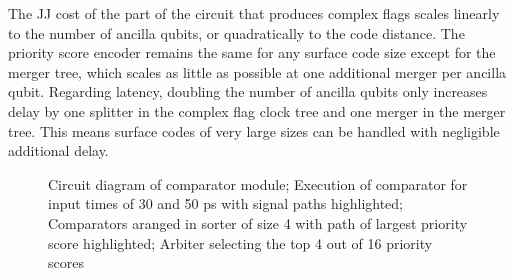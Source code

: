 The JJ cost of the part of the circuit that produces complex flags scales linearly to the number of ancilla qubits, or quadratically to the code distance.
The priority score encoder remains the same for any surface code size except for the merger tree, which scales as little as possible at one additional merger per ancilla qubit.
Regarding latency, doubling the number of ancilla qubits only increases delay by one splitter in the complex flag clock tree and one merger in the merger tree.
This means surface codes of very large sizes can be handled with negligible additional delay.
    \begin{figure}

\caption[]{
   Circuit diagram of comparator module;
 Execution of comparator for input times of 30 and 50 ps with signal paths highlighted;
 Comparators aranged in sorter of size 4 with path of largest priority score highlighted;
 Arbiter selecting the top 4 out of 16 priority scores}%
    \end{figure}

